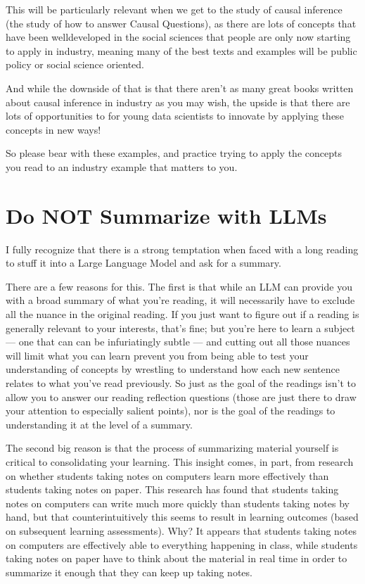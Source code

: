 \documentclass[letterpaper,10pt,english]{jupyterBook}
\begin{document}
\sphinxAtStartPar
This will be particularly relevant when we get to the study of causal inference (the study of how to answer Causal Questions), as there are lots of concepts that have been well\sphinxhyphen{}developed in the social sciences that people are only now starting to apply in industry, meaning many of the best texts and examples will be public policy or social science oriented.

\sphinxAtStartPar
And while the downside of that is that there aren’t as many great books written about causal inference in industry as you may wish, the upside is that there are lots of opportunities to for young data scientists to innovate by applying these concepts in new ways!

\sphinxAtStartPar
So please bear with these examples, and practice trying to apply the concepts you read to an industry example that matters to you.


\section{Do NOT Summarize with LLMs}
\label{\detokenize{40_in_practice/00_how_to_read_this_book:do-not-summarize-with-llms}}
\sphinxAtStartPar
I fully recognize that there is a strong temptation when faced with a long reading to stuff it into a Large Language Model and ask for a summary. 

\sphinxAtStartPar
There are a few reasons for this. The first is that while an LLM can provide you with a broad summary of what you’re reading, it will necessarily have to exclude all the nuance in the original reading. If you just want to figure out if a reading is generally relevant to your interests, that’s fine; but you’re here to learn a subject — one that can can be infuriatingly subtle — and cutting out all those nuances will limit what you can learn  prevent you from being able to test your understanding of concepts by wrestling to understand how each new sentence relates to what you’ve read previously. So just as the goal of the readings isn’t to allow you to answer our reading reflection questions (those are just there to draw your attention to especially salient points), nor is the goal of the readings to understanding it at the level of a summary.

\sphinxAtStartPar
The second big reason is that the process of summarizing material yourself is critical to consolidating your learning. This insight comes, in part, from research on whether students taking notes on computers learn more effectively than students taking notes on paper. This research has found that students taking notes on computers can write much more quickly than students taking notes by hand, but that counter\sphinxhyphen{}intuitively this seems to result in  learning outcomes (based on subsequent learning assessments). Why? It appears that students taking notes on computers are effectively able to  everything happening in class, while students taking notes on paper have to think about the material in real time in order to summarize it enough that they can keep up taking notes.
\end{document}
